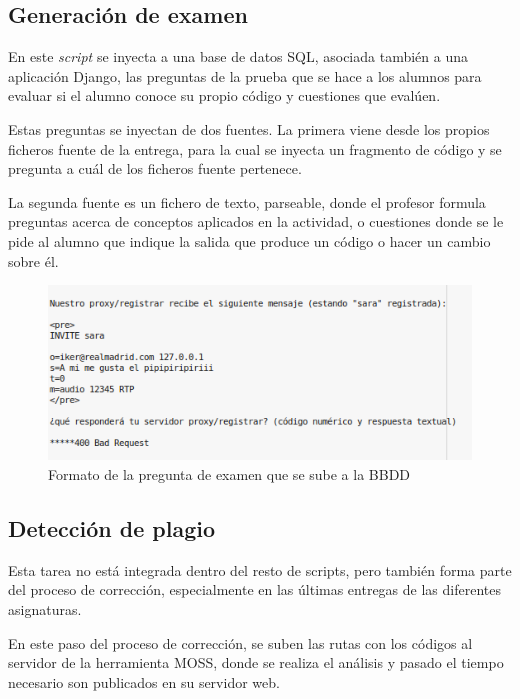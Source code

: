 \subsection{Generación de examen}
\label{sec:gen_exam}

En este \textit{script} se inyecta a una base de datos SQL, asociada también a una aplicación Django, las preguntas de la prueba que se hace a los alumnos para evaluar si el alumno conoce su propio código y cuestiones que evalúen.


Estas preguntas se inyectan de dos fuentes. La primera viene desde los propios ficheros fuente de la entrega, para la cual se inyecta un fragmento de código y se pregunta a cuál de los ficheros fuente pertenece.


La segunda fuente es un fichero de texto, parseable, donde el profesor formula preguntas acerca de conceptos aplicados en la actividad, o cuestiones donde se le pide al alumno que indique la salida que produce un código o hacer un cambio sobre él.

\begin{figure}[H]
   \centering
   \includegraphics[width=16cm]{img/Selection_020_expregunta}
   \caption{Formato de la pregunta de examen que se sube a la BBDD}
   \label{figura:formato_examen}
\end{figure}

\subsection{Detección de plagio}
\label{sec:detec_plagio}

Esta tarea no está integrada dentro del resto de scripts, pero también forma parte del proceso de corrección, especialmente en las últimas entregas de las diferentes asignaturas.

En este paso del proceso de corrección, se suben las rutas con los códigos al servidor de la herramienta MOSS, donde se realiza el análisis y pasado el tiempo necesario son publicados en su servidor web.

